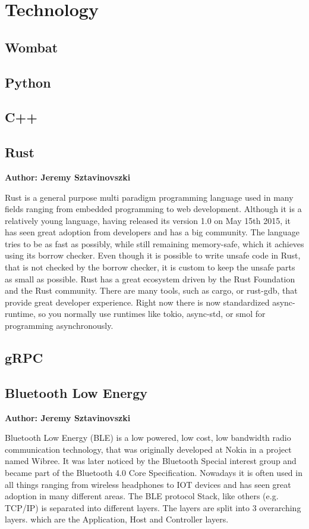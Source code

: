 \chapter{Technology}


\section{Wombat}

\section{Python}

\section{C++}

\section{Rust}
\textbf{Author: Jeremy Sztavinovszki}

Rust is a general purpose multi paradigm programming language used in many fields ranging from embedded programming to web development. Although it is a relatively young language, having released its version 1.0 on May 15th 2015, it has seen great adoption from developers and has a big community. The language tries to be as fast as possibly, while still remaining memory-safe, which it achieves using its borrow checker. Even though it is possible to write unsafe code in Rust, that is not checked by the borrow checker, it is custom to keep the unsafe parts as small as possible.
Rust has a great ecosystem driven by the Rust Foundation and the Rust community. There are many tools, such as cargo, or rust-gdb, that provide great developer experience.
Right now there is now standardized async-runtime, so you normally use runtimes like tokio, async-std, or smol for programming asynchronously.

\section{gRPC}

\section{Bluetooth Low Energy}
\textbf{Author: Jeremy Sztavinovszki}

Bluetooth Low Energy (BLE) is a low powered, low cost, low bandwidth radio communication technology, that was originally developed at Nokia in a project named Wibree. It was later noticed by the Bluetooth Special interest group and became part of the Bluetooth 4.0 Core Specification. Nowadays it is often used in all things ranging from wireless headphones to IOT devices and has seen great adoption in many different areas. The BLE protocol Stack, like others (e.g. TCP/IP) is separated into different layers. The layers are split into 3 overarching layers. which are the Application, Host and Controller layers.

